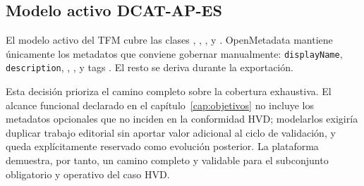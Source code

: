 \subsection{Modelo activo DCAT-AP-ES}

El modelo activo del TFM cubre las clases , , ,  y . OpenMetadata mantiene únicamente los metadatos que conviene gobernar manualmente: \texttt{displayName}, \texttt{description}, , ,  y tags . El resto se deriva durante la exportación.


Esta decisión prioriza el camino completo sobre la cobertura exhaustiva. El alcance funcional declarado en el capítulo~\ref{cap:objetivos} no incluye los metadatos opcionales que no inciden en la conformidad \ac{HVD}; modelarlos exigiría duplicar trabajo editorial sin aportar valor adicional al ciclo de validación, y queda explícitamente reservado como evolución posterior. La plataforma demuestra, por tanto, un camino completo y validable para el subconjunto obligatorio y operativo del caso \ac{HVD}.
